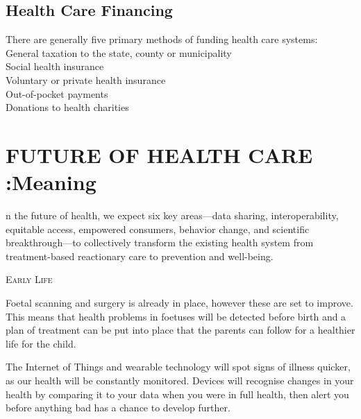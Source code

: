 \documentclass[12pt]{article}
\begin{document}
\begin{flushleft}
\subsection{Health Care Financing}
There are generally five primary methods of funding health care systems:\\

General taxation to the state, county or municipality\\
Social health insurance\\
Voluntary or private health insurance\\
Out-of-pocket payments\\
Donations to health charities\\
[1cm]
\end{flushleft}






\section{FUTURE OF HEALTH CARE :Meaning}
n the future of health, we expect six key areas—data sharing, interoperability, equitable access, empowered consumers, behavior change, and scientific breakthrough—to collectively transform the existing health system from treatment-based reactionary care to prevention and well-being.






\begin{flushleft}
\textsc{\large  Early Life  }
\end{flushleft}
   

Foetal scanning and surgery is already in place, however these are set to improve. This means that health problems in foetuses will be detected before birth and a plan of treatment can be put into place that the parents can follow for a healthier life for the child.

The Internet of Things and wearable technology will spot signs of illness quicker, as our health will be constantly monitored. Devices will recognise changes in your health by comparing it to your data when you were in full health, then alert you before anything bad has a chance to develop further.
\end{document}
